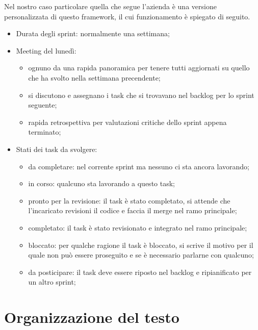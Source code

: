 Nel nostro caso particolare quella che segue l'azienda è una versione personalizzata di questo framework, il cui funzionamento è spiegato di seguito.
\begin{itemize}
  \item Durata degli sprint: normalmente una settimana;
  \item Meeting del lunedì:
        \begin{itemize}
          \item ognuno da una rapida panoramica per tenere tutti aggiornati su quello che ha svolto nella settimana precendente;
          \item si discutono e assegnano i task che si trovavano nel backlog per lo sprint seguente;
          \item rapida retrospettiva per valutazioni critiche dello sprint appena terminato;
        \end{itemize}
  \item Stati dei task da svolgere:
        \begin{itemize}
          \item da completare: nel corrente sprint ma nessuno ci sta ancora lavorando;
          \item in corso: qualcuno sta lavorando a questo task;
          \item pronto per la revisione: il task è stato completato, si attende che l'incaricato revisioni il codice e faccia il merge nel ramo principale;
          \item completato: il task è stato revisionato e integrato nel ramo principale;
          \item bloccato: per qualche ragione il task è bloccato, si scrive il motivo per il quale non può essere proseguito e se è necessario parlarne con qualcuno;
          \item da posticipare: il task deve essere riposto nel backlog e ripianificato per un altro sprint;
        \end{itemize}
\end{itemize}

\section{Organizzazione del testo}

